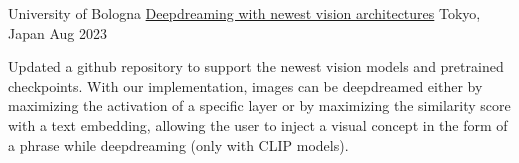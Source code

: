 \begin{cventries}


\cventry
  {University of Bologna} %
  {\href{https://github.com/Dundalia/pytorch-deepdream}{Deepdreaming with newest vision architectures}} 
  {Tokyo, Japan} %
  {Aug 2023} %
  {
    \begin{cvitems} %
      \item {Updated a github repository to support the newest vision models and pretrained checkpoints. With our implementation, images can be deepdreamed either by maximizing the activation of a specific layer or by maximizing the similarity score with a text embedding, allowing the user to inject a visual concept in the form of a phrase while deepdreaming (only with CLIP models).}
    \end{cvitems}
  }



\end{cventries}
